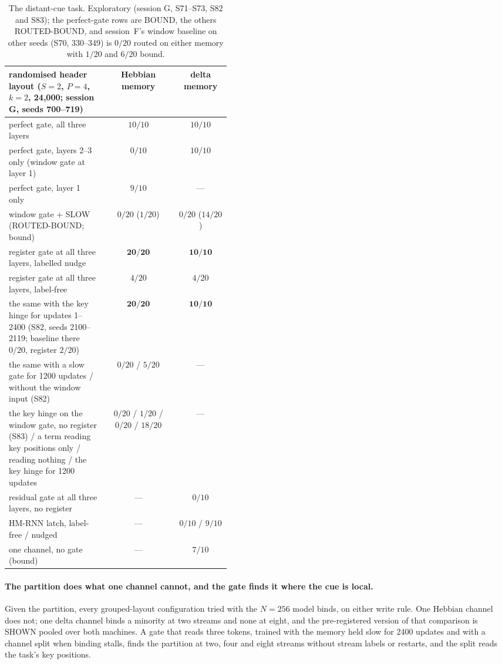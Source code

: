 \documentclass[11pt]{article}
\begin{document}
\begin{table}[H]
\centering
\footnotesize
\setlength{\tabcolsep}{4pt}
\begin{tabular}{@{}>{\raggedright\arraybackslash}p{0.44\linewidth}cc@{}}
\toprule
randomised header layout ($S{=}2$, $P{=}4$, $k{=}2$, 24{,}000; session G, seeds 700--719) & Hebbian memory & delta memory\\
\midrule
perfect gate, all three layers & $10/10$ & $10/10$\\
perfect gate, layers 2--3 only (window gate at layer 1) & $0/10$ & $10/10$\\
perfect gate, layer 1 only & $9/10$ & ---\\
window gate + SLOW (ROUTED-BOUND; bound) & $0/20$ ($1/20$) & $0/20$ ($14/20$)\\
register gate at all three layers, labelled nudge & $\mathbf{20/20}$ & $\mathbf{10/10}$\\
register gate at all three layers, label-free & $4/20$ & $4/20$\\
the same with the key hinge for updates 1--2400 (S82, seeds 2100--2119; baseline there $0/20$, register $2/20$) & $\mathbf{20/20}$ & $\mathbf{10/10}$\\
the same with a slow gate for 1200 updates / without the window input (S82) & $0/20$ / $5/20$ & ---\\
the key hinge on the window gate, no register (S83) / a term reading key positions only / reading nothing / the key hinge for 1200 updates & $0/20$ / $1/20$ / $0/20$ / $18/20$ & ---\\
residual gate at all three layers, no register & --- & $0/10$\\
HM-RNN latch, label-free / nudged & --- & $0/10$ / $9/10$\\
one channel, no gate (bound) & --- & $7/10$\\
\bottomrule
\end{tabular}
\caption{The distant-cue task. Exploratory (session G, S71--S73, S82 and S83); the perfect-gate rows are BOUND, the others ROUTED-BOUND, and session~F's window baseline on other seeds (S70, 330--349) is $0/20$ routed on either memory with $1/20$ and $6/20$ bound.}
\label{tab:far}
\end{table}

\paragraph{The partition does what one channel cannot, and the gate finds it where the cue is local.} Given the partition, every grouped-layout configuration tried with the $N = 256$ model binds, on either write rule. One Hebbian channel does not; one delta channel binds a minority at two streams and none at eight, and the pre-registered version of that comparison is SHOWN pooled over both machines. A gate that reads three tokens, trained with the memory held slow for 2400 updates and with a channel split when binding stalls, finds the partition at two, four and eight streams without stream labels or restarts, and the split reads the task's key positions.
\end{document}
